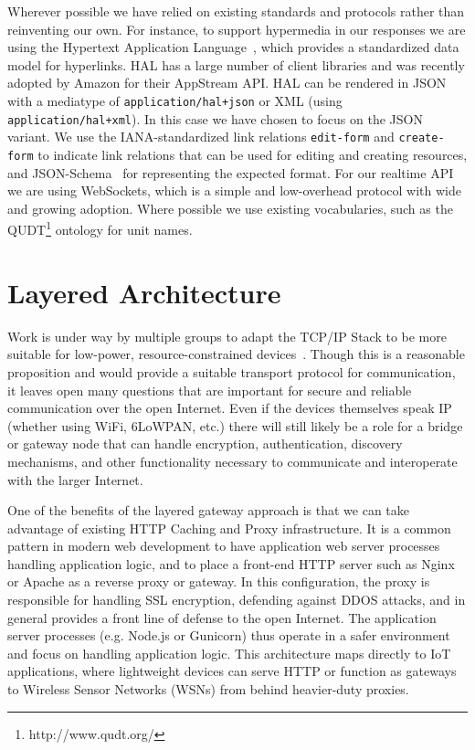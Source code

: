 \documentclass{acm_proc_article-sp}
\begin{document}
Wherever possible we have relied on existing standards and protocols rather
than reinventing our own. For instance, to support hypermedia in our responses
we are using the Hypertext Application Language~\cite{json-hal-draft}, which
provides a standardized data model for hyperlinks. HAL has a large number of
client libraries and was recently adopted by Amazon for their AppStream API.
HAL can be rendered in JSON with a mediatype of \texttt{application/hal+json}
or XML (using \mbox{\texttt{application/hal+xml}}). In this case we have chosen to focus on
the JSON variant. We use the IANA-standardized link relations
\texttt{edit-form} and \texttt{create-form} to indicate link relations that can
be used for editing and creating resources, and
JSON-Schema~\cite{json-schema-draft} for representing the expected format. For
our realtime API we are using WebSockets, which is a simple and low-overhead
protocol with wide and growing adoption. Where possible we use existing
vocabularies, such as the QUDT\footnote{http://www.qudt.org/} ontology for unit
names.

\section{Layered Architecture}

Work is under way by multiple groups to adapt the TCP/IP Stack to be more
suitable for low-power, resource-constrained devices~\cite{iotsurvey}. Though
this is a reasonable proposition and would provide a suitable transport
protocol for communication, it leaves open many questions that are important
for secure and reliable communication over the open Internet. Even if the
devices themselves speak IP (whether using WiFi, 6LoWPAN, etc.) there will
still likely be a role for a bridge or gateway node that can handle encryption,
authentication, discovery mechanisms, and other functionality necessary to
communicate and interoperate with the larger Internet.

One of the benefits of the layered gateway approach is that we can take
advantage of existing HTTP Caching and Proxy infrastructure. It is a common
pattern in modern web development to have application web server processes
handling application logic, and to place a front-end HTTP server such as Nginx
or Apache as a reverse proxy or gateway. In this configuration, the proxy is
responsible for handling SSL encryption, defending against DDOS attacks, and in
general provides a front line of defense to the open Internet. The application
server processes (e.g.  Node.js or Gunicorn) thus operate in a safer
environment and focus on handling application logic. This architecture maps
directly to IoT applications, where lightweight devices can serve HTTP or
function as gateways to Wireless Sensor Networks (WSNs) from behind
heavier-duty proxies.
\end{document}
